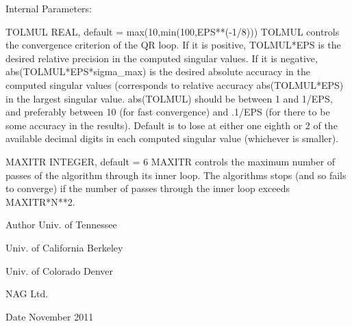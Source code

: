 \begin{DoxyParagraph}{Internal Parameters\+: }
\begin{DoxyVerb}  TOLMUL  REAL, default = max(10,min(100,EPS**(-1/8)))
          TOLMUL controls the convergence criterion of the QR loop.
          If it is positive, TOLMUL*EPS is the desired relative
             precision in the computed singular values.
          If it is negative, abs(TOLMUL*EPS*sigma_max) is the
             desired absolute accuracy in the computed singular
             values (corresponds to relative accuracy
             abs(TOLMUL*EPS) in the largest singular value.
          abs(TOLMUL) should be between 1 and 1/EPS, and preferably
             between 10 (for fast convergence) and .1/EPS
             (for there to be some accuracy in the results).
          Default is to lose at either one eighth or 2 of the
             available decimal digits in each computed singular value
             (whichever is smaller).

  MAXITR  INTEGER, default = 6
          MAXITR controls the maximum number of passes of the
          algorithm through its inner loop. The algorithms stops
          (and so fails to converge) if the number of passes
          through the inner loop exceeds MAXITR*N**2.\end{DoxyVerb}
 
\end{DoxyParagraph}
\begin{DoxyAuthor}{Author}
Univ. of Tennessee 

Univ. of California Berkeley 

Univ. of Colorado Denver 

N\+A\+G Ltd. 
\end{DoxyAuthor}
\begin{DoxyDate}{Date}
November 2011 
\end{DoxyDate}
